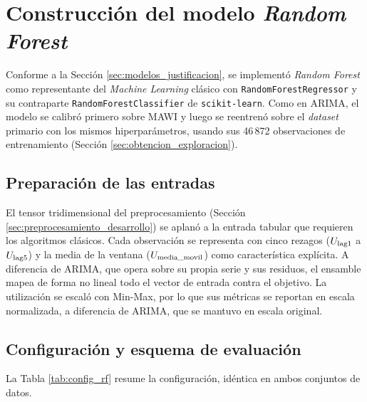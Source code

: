 \documentclass[12pt]{report}
\begin{document}
\section{Construcción del modelo \textit{Random Forest}}
\label{sec:rf_desarrollo}

Conforme a la Sección \ref{sec:modelos_justificacion}, se implementó \textit{Random Forest} como representante del \textit{Machine Learning} clásico con \texttt{RandomForestRegressor} y su contraparte \texttt{RandomForestClassifier} de \texttt{scikit-learn}. Como en ARIMA, el modelo se calibró primero sobre MAWI y luego se reentrenó sobre el \textit{dataset} primario con los mismos hiperparámetros, usando sus 46\,872 observaciones de entrenamiento (Sección \ref{sec:obtencion_exploracion}).

\subsection*{Preparación de las entradas}

El tensor tridimensional del preprocesamiento (Sección \ref{sec:preprocesamiento_desarrollo}) se aplanó a la entrada tabular que requieren los algoritmos clásicos. Cada observación se representa con cinco rezagos ($U_{\mbox{\scriptsize lag1}}$ a $U_{\mbox{\scriptsize lag5}}$) y la media de la ventana ($U_{\mbox{\scriptsize media\_movil}}$) como característica explícita. A diferencia de ARIMA, que opera sobre su propia serie y sus residuos, el ensamble mapea de forma no lineal todo el vector de entrada contra el objetivo. La utilización se escaló con Min-Max, por lo que sus métricas se reportan en escala normalizada, a diferencia de ARIMA, que se mantuvo en escala original.

\subsection*{Configuración y esquema de evaluación}

La Tabla \ref{tab:config_rf} resume la configuración, idéntica en ambos conjuntos de datos.
\end{document}
